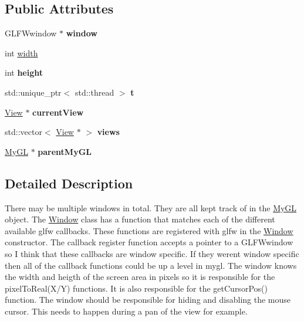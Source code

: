 \subsection*{Public Attributes}
\begin{DoxyCompactItemize}
\item 
\hypertarget{classWindow_a9957db4afdad3d57e5c5b6626b44b6d0}{}G\+L\+F\+Wwindow $\ast$ {\bfseries window}\label{classWindow_a9957db4afdad3d57e5c5b6626b44b6d0}

\item 
int \hyperlink{classWindow_af5b1c436782cc9752d386493fbc5dc8c}{width}
\item 
\hypertarget{classWindow_af0ac1732ca6b79a6f6b78aa344140514}{}int {\bfseries height}\label{classWindow_af0ac1732ca6b79a6f6b78aa344140514}

\item 
\hypertarget{classWindow_a76199e6c3402c180d76133da74287f38}{}std\+::unique\+\_\+ptr$<$ std\+::thread $>$ {\bfseries t}\label{classWindow_a76199e6c3402c180d76133da74287f38}

\item 
\hypertarget{classWindow_adb20638db6607fcf6aeb1d06ab6b73f5}{}\hyperlink{classView}{View} $\ast$ {\bfseries current\+View}\label{classWindow_adb20638db6607fcf6aeb1d06ab6b73f5}

\item 
\hypertarget{classWindow_a25bf6f8672c20d053f6f4db8d059fedc}{}std\+::vector$<$ \hyperlink{classView}{View} $\ast$ $>$ {\bfseries views}\label{classWindow_a25bf6f8672c20d053f6f4db8d059fedc}

\item 
\hypertarget{classWindow_a27b66f6aca412b9275fd09d0b203ea78}{}\hyperlink{classMyGL}{My\+G\+L} $\ast$ {\bfseries parent\+My\+G\+L}\label{classWindow_a27b66f6aca412b9275fd09d0b203ea78}

\end{DoxyCompactItemize}


\subsection{Detailed Description}
There may be multiple windows in total. They are all kept track of in the \hyperlink{classMyGL}{My\+G\+L} object. The \hyperlink{classWindow}{Window} class has a function that matches each of the different available glfw callbacks. These functions are registered with glfw in the \hyperlink{classWindow}{Window} constructor. The callback register function accepts a pointer to a G\+L\+F\+Wwindow so I think that these callbacks are window specific. If they weren\textquotesingle{}t window specific then all of the callback functions could be up a level in mygl. The window knows the width and heigth of the screen area in pixels so it is responsible for the pixel\+To\+Real(X/\+Y) functions. It is also responsible for the get\+Cursor\+Pos() function. The window should be responsible for hiding and disabling the mouse cursor. This needs to happen during a pan of the view for example. 

